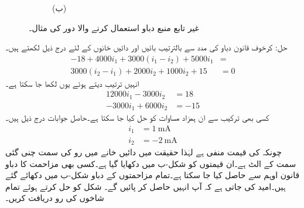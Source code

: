 \begin{figure}
\begin{subfigure}{1\textwidth}
%
\caption*{(ب)}
\end{subfigure}
\caption{غیر تابع منبع دباو استعمال کرنے والا دور کی مثال۔}
\label{شکل_جوڑ_آزاد_منبع_دباو_دائری_مثال_الف}
\end{figure}%

حل: کرخوف قانون دباو کی مدد سے بالترتیب بائیں اور دائیں خانوں کے لئے درج ذیل لکھتے ہیں۔
\begin{align*}
-18+4000 i_1 +3000(i_1-i_2)+5000 i_1&=\\
3000(i_2-i_1)+2000 i_2+1000 i_2+15&=0
\end{align*} 
انہیں ترتیب دیتے ہوئے یوں لکھا جا سکتا ہے۔
\begin{align*}
12000 i_1-3000 i_2&=18\\
-3000 i_1+6000 i_2&=-15
\end{align*}
کسی بھی ترکیب سے ان ہمزاد مساوات کو حل کیا جا سکتا ہے۔حاصل جوابات درج ذیل ہیں۔
\begin{align*}
i_1&=\SI{1}{\milli\ampere}\\
i_2&=\SI{-2}{\milli\ampere}
\end{align*}
چونکہ  کی قیمت منفی ہے لہٰذا حقیقت میں دائیں خانے میں رو کی سمت چنی گئی سمت کے الٹ ہے۔ان قیمتوں کو شکل-ب میں دکھایا گیا ہے۔کسی بھی مزاحمت کا دباو قانون اوہم سے حاصل کیا جا سکتا ہے۔تمام مزاحمتوں کے دباو شکل-ب میں دکھائے گئے ہیں۔امید کی جاتی ہے کہ آپ انہیں حاصل کر پائیں گے۔
شکل  کو حل کرتے ہوئے  تمام شاخوں کی رو دریافت کریں۔


